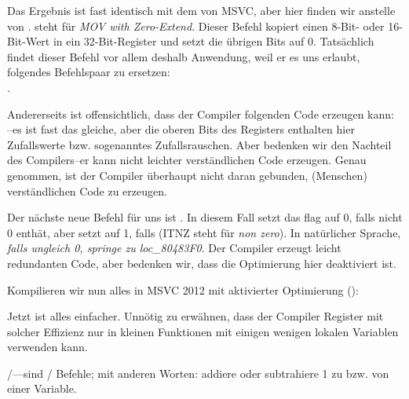 \label{movzx}

Das Ergebnis ist fast identisch mit dem von MSVC, aber hier finden wir \MOVZX
anstelle von \MOVSX. 
\MOVZX steht für \emph{MOV with Zero-Extend}. 
Dieser Befehl kopiert einen 8-Bit- oder 16-Bit-Wert in ein 32-Bit-Register und
setzt die übrigen Bits auf 0.
Tatsächlich findet dieser Befehl vor allem deshalb Anwendung, weil er es uns
erlaubt, folgendes Befehlspaar zu ersetzen:\\
.

Andererseits ist offensichtlich, dass der Compiler folgenden Code erzeugen kann:
\\
--es ist fast das gleiche, aber die
oberen Bits des \EAX Registers enthalten hier Zufallswerte bzw.
sogenanntes Zufallsrauschen.
Aber bedenken wir den Nachteil des Compilers--er kann nicht leichter
verständlichen Code erzeugen. 
Genau genommen, ist der Compiler überhaupt nicht daran gebunden, (Menschen)
verständlichen Code zu erzeugen.


Der nächste neue Befehl für uns ist \SETNZ.
In diesem Fall setzt  das \ZF flag auf 0, falls \AL nicht 0
enthät, aber \SETNZ setzt \AL auf 1, falls  (IT{NZ} steht für
\emph{non zero}).
In natürlicher Sprache, \emph{falls \AL ungleich 0, springe zu loc\_80483F0}. 
Der Compiler erzeugt leicht redundanten Code, aber bedenken wir, dass die
Optimierung hier deaktiviert ist.

\label{strlen_MSVC_Ox}

Kompilieren wir nun alles in MSVC 2012 mit aktivierter Optimierung (\Ox):



Jetzt ist alles einfacher.
Unnötig zu erwähnen, dass der Compiler Register mit solcher Effizienz nur in
kleinen Funktionen mit einigen wenigen lokalen Variablen verwenden kann.

\INC/\DEC---sind / Befehle; mit anderen Worten:
addiere oder subtrahiere 1 zu bzw. von einer Variable. 





